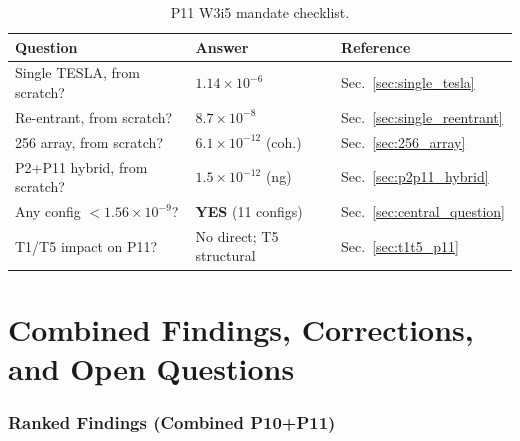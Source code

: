 \documentclass[11pt]{article}
\theoremstyle{definition}
\theoremstyle{remark}
\newcommand{\ee}[1]{\times 10^{#1}}
\begin{document}
\begin{table}[h]
\centering
\caption{P11 W3i5 mandate checklist.}
\begin{tabular}{@{}p{6cm}lp{3cm}@{}}
\toprule
Question & Answer & Reference \\
\midrule
Single TESLA, from scratch? & $1.14\ee{-6}$ &
  Sec.~\ref{sec:single_tesla} \\
Re-entrant, from scratch? & $8.7\ee{-8}$ &
  Sec.~\ref{sec:single_reentrant} \\
256 array, from scratch? & $6.1\ee{-12}$ (coh.) &
  Sec.~\ref{sec:256_array} \\
P2+P11 hybrid, from scratch? & $1.5\ee{-12}$ (ng) &
  Sec.~\ref{sec:p2p11_hybrid} \\
Any config $< 1.56\ee{-9}$? & \textbf{YES} (11 configs) &
  Sec.~\ref{sec:central_question} \\
T1/T5 impact on P11? & No direct; T5 structural &
  Sec.~\ref{sec:t1t5_p11} \\
\bottomrule
\end{tabular}
\end{table}


\newpage
\part{Combined Findings, Corrections, and Open Questions}

\section{Ranked Findings (Combined P10+P11)}
\label{sec:ranked_findings}
\end{document}
